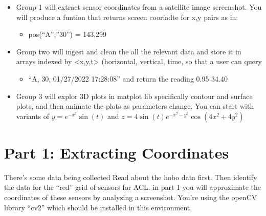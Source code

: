 \documentclass[letterpaper,10pt,english]{jupyterBook}
\begin{document}
\begin{itemize}
\item {} 
\sphinxAtStartPar
Group 1 will extract sensor coordinates from a satellite image screenshot. You will produce a funtion that returns screen cooriadte for x,y pairs as in:
\begin{itemize}
\item {} 
\sphinxAtStartPar
pos(“A”,”30”) = 143,299

\end{itemize}

\item {} 
\sphinxAtStartPar
Group two will ingest and clean the all the relevant data and store it in arrays indexed by <x,y,t> (horizontal, vertical, time, so that a user can query
\begin{itemize}
\item {} 
\sphinxAtStartPar
“A, 30, 01/27/2022 17:28:08” and return the reading \sphinxhyphen{}0.95	34.40

\end{itemize}

\item {} 
\sphinxAtStartPar
Group 3 will explor 3D plots in matplot lib specifically contour and surface plots, and then animate the plots as parameters change. You can start with variants of \(y = e^{-x^2} \sin(t)\) and \(z =4 \sin (t) e^{-x^2-y^2} \cos \left(4 x^2+4 y^2\right)\)

\end{itemize}


\section{Part 1: Extracting Coordinates}
\label{\detokenize{lessons/Hobo_Student:part-1-extracting-coordinates}}
\sphinxAtStartPar
There’s some data being collected  Read about the hobo data first. Then identify the data for the “red” grid of sensors for ACL. in part 1 you will approximate the coordinates of these sensors by analyzing a screenshot. You’re using the openCV library “cv2” which should be installed in this environment.
\end{document}
